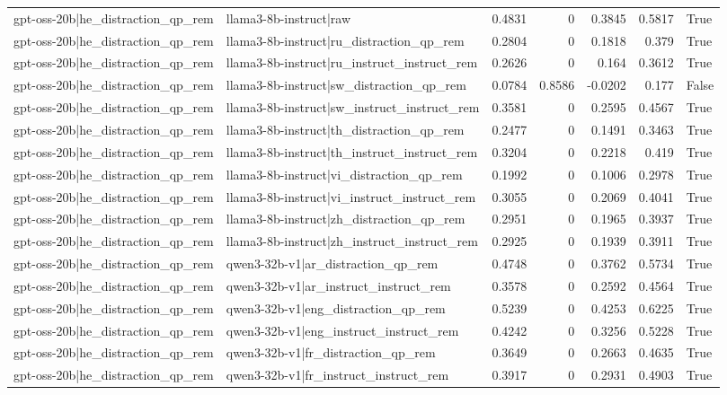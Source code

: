 \begin{table}
\begin{tabular}{l l r r r r l}
gpt-oss-20b|he_distraction_qp_rem & llama3-8b-instruct|raw & 0.4831 & 0 & 0.3845 & 0.5817 & True \\
gpt-oss-20b|he_distraction_qp_rem & llama3-8b-instruct|ru_distraction_qp_rem & 0.2804 & 0 & 0.1818 & 0.379 & True \\
gpt-oss-20b|he_distraction_qp_rem & llama3-8b-instruct|ru_instruct_instruct_rem & 0.2626 & 0 & 0.164 & 0.3612 & True \\
gpt-oss-20b|he_distraction_qp_rem & llama3-8b-instruct|sw_distraction_qp_rem & 0.0784 & 0.8586 & -0.0202 & 0.177 & False \\
gpt-oss-20b|he_distraction_qp_rem & llama3-8b-instruct|sw_instruct_instruct_rem & 0.3581 & 0 & 0.2595 & 0.4567 & True \\
gpt-oss-20b|he_distraction_qp_rem & llama3-8b-instruct|th_distraction_qp_rem & 0.2477 & 0 & 0.1491 & 0.3463 & True \\
gpt-oss-20b|he_distraction_qp_rem & llama3-8b-instruct|th_instruct_instruct_rem & 0.3204 & 0 & 0.2218 & 0.419 & True \\
gpt-oss-20b|he_distraction_qp_rem & llama3-8b-instruct|vi_distraction_qp_rem & 0.1992 & 0 & 0.1006 & 0.2978 & True \\
gpt-oss-20b|he_distraction_qp_rem & llama3-8b-instruct|vi_instruct_instruct_rem & 0.3055 & 0 & 0.2069 & 0.4041 & True \\
gpt-oss-20b|he_distraction_qp_rem & llama3-8b-instruct|zh_distraction_qp_rem & 0.2951 & 0 & 0.1965 & 0.3937 & True \\
gpt-oss-20b|he_distraction_qp_rem & llama3-8b-instruct|zh_instruct_instruct_rem & 0.2925 & 0 & 0.1939 & 0.3911 & True \\
gpt-oss-20b|he_distraction_qp_rem & qwen3-32b-v1|ar_distraction_qp_rem & 0.4748 & 0 & 0.3762 & 0.5734 & True \\
gpt-oss-20b|he_distraction_qp_rem & qwen3-32b-v1|ar_instruct_instruct_rem & 0.3578 & 0 & 0.2592 & 0.4564 & True \\
gpt-oss-20b|he_distraction_qp_rem & qwen3-32b-v1|eng_distraction_qp_rem & 0.5239 & 0 & 0.4253 & 0.6225 & True \\
gpt-oss-20b|he_distraction_qp_rem & qwen3-32b-v1|eng_instruct_instruct_rem & 0.4242 & 0 & 0.3256 & 0.5228 & True \\
gpt-oss-20b|he_distraction_qp_rem & qwen3-32b-v1|fr_distraction_qp_rem & 0.3649 & 0 & 0.2663 & 0.4635 & True \\
gpt-oss-20b|he_distraction_qp_rem & qwen3-32b-v1|fr_instruct_instruct_rem & 0.3917 & 0 & 0.2931 & 0.4903 & True \\

\end{tabular}
\end{table}
